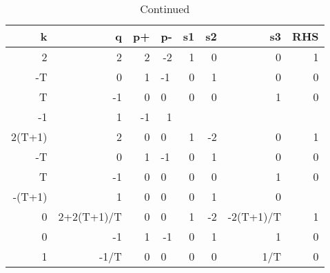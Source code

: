 \begin{table}[ht]
    \ContinuedFloat
    \caption{Continued}

    \begin{tabular}{rrrlrrrr}
        k      & q          & p+ & \multicolumn{1}{r}{p-} & s1        & s2         & s3          & RHS       \\ \hline
        2      & 2          & 2  & \multicolumn{1}{r}{-2} & 1         & 0          & 0           & 1         \\
        -T     & 0          & 1  & -1                     & 0         & 1          & 0           & 0         \\
        T      & -1         & 0  & 0                      & 0         & 0          & 1           & 0         \\
        -1     & 1          & -1 & \multicolumn{1}{r}{1}  &           &            &             &           \\ \hline
        2(T+1) & 2          & 0  & 0                      & 1         & -2         & 0           & 1         \\ \hline
        -T     & 0          & 1  & -1                     & 0         & 1          & 0           & 0         \\
        T      & -1         & 0  & 0                      & 0         & 0          & 1           & 0         \\
        -(T+1) & 1          & 0  & 0                      & 0         & 1          & 0           &           \\ \hline
        0      & 2+2(T+1)/T & 0  & 0                      & 1         & -2         & -2(T+1)/T   & 1         \\ \hline
        0      & -1         & 1  & \multicolumn{1}{r}{-1} & 0         & 1          & 1           & 0         \\
        1      & -1/T       & 0  & 0                      & 0         & 0          & 1/T         & 0         \\

\end{tabular}
\end{table}
